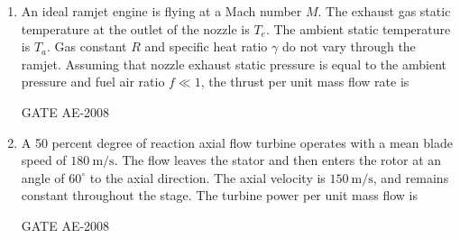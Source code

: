 \documentclass[journal,12pt,onecolumn]{IEEEtran}
\theoremstyle{remark}
\begin{document}
\begin{enumerate}
\item  An ideal ramjet engine is flying at a Mach number $M$. The exhaust gas static temperature at the outlet of the nozzle is $T_e$. The ambient static temperature is $T_a$. Gas constant $R$ and specific heat ratio $\gamma$ do not vary through the ramjet. Assuming that nozzle exhaust static pressure is equal to the ambient pressure and fuel air ratio $f \ll 1$, the thrust per unit mass flow rate is  \\
\begin{enumerate}
\end{enumerate}
 \hfill{GATE AE-2008}

    \quad

\item A 50 percent degree of reaction axial flow turbine operates with a mean blade speed of $180 \ \mathrm{m/s}$. The flow leaves the stator and then enters the rotor at an angle of $60^\circ$ to the axial direction. The axial velocity is $150 \ \mathrm{m/s}$, and remains constant throughout the stage. The turbine power per unit mass flow is  \\
\begin{enumerate}
\end{enumerate}
\hfill{GATE AE-2008}

    \quad


\end{enumerate}
\end{document}
